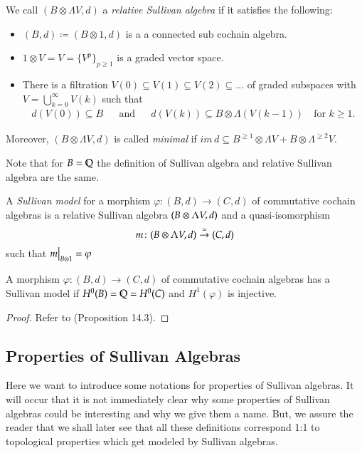 \begin{Definition}
 We call $(B \otimes \Lambda V,d)$ a \emph{relative Sullivan algebra} if it satisfies the following:
 
 \begin{itemize}
  \item $(B,d) \coloneqq (B \otimes 1, d)$ is a a connected sub cochain algebra.
  \item $1 \otimes V = V = { \lbrace V^p \rbrace}_{ p \geq 1}$ is a graded vector space.
  \item There is a filtration $V(0) \subseteq V(1) \subseteq V(2) \subseteq \ldots$ of graded subspaces
    with  $ V = \bigcup_{k = 0}^{\infty} V(k)$ such that 
    \begin{align*}
     d(V(0)) \subseteq B &  & \text{and} & & d(V(k)) \subseteq B \otimes \Lambda (V(k-1)) \quad \text{for $k \geq 1$.}
    \end{align*}
 \end{itemize}
 Moreover, $(B \otimes \Lambda V,d)$ is called \emph{minimal} if 
 $im \, d \subseteq B^{\geq 1} \otimes \Lambda V + B \otimes \Lambda^{\geq 2} V$.
\end{Definition}

\begin{Remark}
 Note that for $B = \mathbb{Q}$ the definition of Sullivan algebra and relative Sullivan algebra are the same.
\end{Remark}

\begin{Definition}

 A \emph{Sullivan model} for a morphism $\varphi \colon (B,d) \to (C,d)$ of commutative cochain algebras is
 a relative Sullivan algebra $(B \otimes \Lambda V,d)$ and a quasi-isomorphism
 $$ m \colon (B \otimes \Lambda V,d) \overset{\simeq}{\to} (C,d) $$
 such that $\restr{m}{B \otimes 1} = \varphi$ 
\end{Definition}

\begin{Proposition}
\label{prop:ExistenceMorphismSullivanModels}
 A morphism $\varphi \colon (B,d) \to (C,d)$ of commutative cochain algebras has a Sullivan model
 if $H^0(B) = \mathbb{Q} = H^0(C)$ and $H^1(\varphi)$ is injective.
\end{Proposition}
\begin{proof}
 Refer to \cite{Felix2001} (Proposition 14.3).
\end{proof}

\subsection{Properties of Sullivan Algebras}
Here we want to introduce some notations for properties of Sullivan algebras. It will occur that it is not 
immediately clear why some properties of Sullivan algebras could be interesting and why we give them a name. But, we assure
the reader that we shall later see that all these definitions correspond 1:1 to topological properties which
get modeled by Sullivan algebras.

